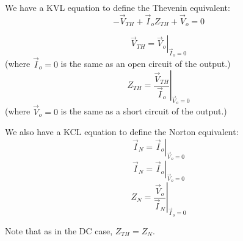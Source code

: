 \vspace{0.2in}
We have a KVL equation to define the Thevenin equivalent:
\[
-\vec{V}_{TH} + \vec{I}_o Z_{TH} + \vec{V}_o = 0
\]

\[\boxed{
\vec{V}_{TH} = \left . \vec{V}_o \right |_{\vec{I}_o=0}
}
\]
(where $\vec{I}_o=0$ is the same as an open circuit of the output.)
\[\boxed{
Z_{TH} = \left . \frac
        { \vec{V}_{TH}}
        { \vec{I}_o}
        \right |_{\vec{V}_o=0  }
  }
\]
(where $\vec{V}_o=0$ is the same as a short circuit of the output.)

We also have a KCL equation to define the Norton equivalent:
\[
\vec{I}_N = \left . \vec{I}_o \right|_{\vec{V}_o=0}
\]
\[\boxed{
\vec{I}_N = \left . \vec{I}_o \right|_{\vec{V}_o=0}
}
\]
\[\boxed{
Z_N = \left . \frac {\vec{V}_o}  {\vec{I}_N} \right | _{\vec{I}_o = 0} }
\]


Note that as in the DC case, $Z_{TH} =Z_N$.



